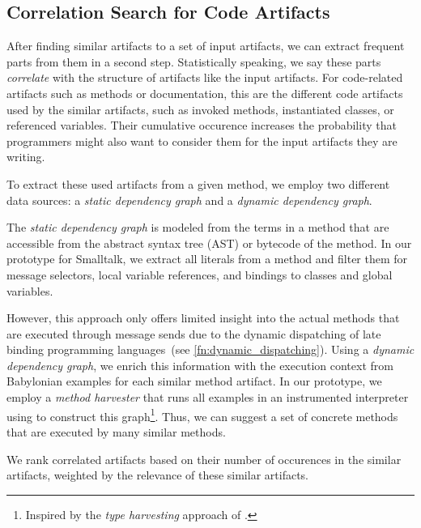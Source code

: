 \subsection{Correlation Search for Code Artifacts}
\label{sec:suggestions/search/correlations}


After finding similar artifacts to a set of input artifacts, we can extract frequent parts from them in a second step.
Statistically speaking, we say these parts \emph{correlate} with the structure of artifacts like the input artifacts.
For code-related artifacts such as methods or documentation, this are the different code artifacts used by the similar artifacts, such as invoked methods, instantiated classes, or referenced variables.
Their cumulative occurence increases the probability that programmers might also want to consider them for the input artifacts they are writing. %

To extract these used artifacts from a given method, we employ two different data sources: a \emph{static dependency graph} and a \emph{dynamic dependency graph}.

The \emph{static dependency graph} is modeled from the terms in a method that are accessible from the abstract syntax tree (AST) or bytecode of the method.
In our prototype for Smalltalk, we extract all literals from a method and filter them for message selectors, local variable references, and bindings to classes and global variables.

However, this approach only offers limited insight into the actual methods that are executed through message sends due to the dynamic dispatching of late binding programming languages~(see \cref{fn:dynamic_dispatching}).
Using a \emph{dynamic dependency graph}, we enrich this information with the execution context from Babylonian examples for each similar method artifact.
In our prototype, we employ a \emph{method harvester} that runs all examples in an instrumented interpreter using  to construct this graph\footnote{Inspired by the \emph{type harvesting} approach of \cite{haupt2011type}.}.
Thus, we can suggest a set of concrete methods that are executed by many similar methods.

We rank correlated artifacts based on their number of occurences in the similar artifacts, weighted by the relevance of these similar artifacts.



